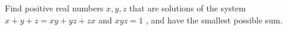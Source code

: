 Find positive real numbers $x,y,z$ that are solutions of the system
$x+y+z=xy+yz+zx$ and $xyz=1$ , and have the smallest possible sum.